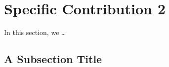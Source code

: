 \documentclass[../techreport.tex]{subfiles}
\begin{document}
\section{Specific Contribution 2}
\label{sec:specific2}
In this section, we \ldots
\subsection{A Subsection Title}
\lipsum[17]
\end{document}
